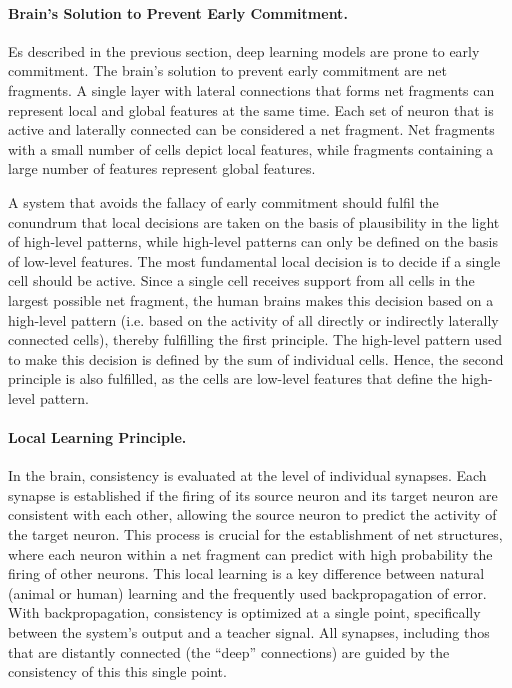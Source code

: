 \paragraph{Brain's Solution to Prevent Early Commitment.}
Es described in the previous section, deep learning models are prone to early commitment.
The brain's solution to prevent early commitment are net fragments.
A single layer with lateral connections that forms net fragments can represent local and global features at the same time.
Each set of neuron that is active and laterally connected can be considered a net fragment. Net fragments with a small number of cells depict local features, while fragments containing a large number of features represent global features.

A system that avoids the fallacy of early commitment should fulfil the conundrum that local decisions are taken on the basis of plausibility in the light of high-level patterns, while high-level patterns can only be defined on the basis of low-level features.
The most fundamental local decision is to decide if a single cell should be active. Since a single cell receives support from all cells in the largest possible net fragment,
the human brains makes this decision based on a high-level pattern (i.e. based on the activity of all directly or indirectly laterally connected cells), thereby fulfilling the first principle. The high-level pattern used to make this decision is defined by the sum of individual cells. Hence, the second principle is also fulfilled, as the cells are low-level features that define the high-level pattern.

\paragraph{Local Learning Principle.} In the brain, consistency is evaluated at the level of individual synapses. Each synapse is established if the firing of its source neuron and its target neuron are consistent with each other, allowing the source neuron to predict the activity of the target neuron. This process is crucial for the establishment of net structures, where each neuron within a net fragment can predict with high probability the firing of other neurons.
This local learning is a key difference between natural (animal or human) learning and the frequently used backpropagation of error. With backpropagation, consistency is optimized at a single point, specifically between the system's output and a teacher signal. All synapses, including thos that are distantly connected (the ``deep'' connections) are guided by the consistency of this this single point.

